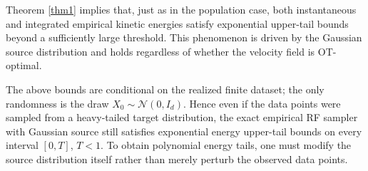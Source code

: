 \documentclass[a4paper,11pt]{article}
\theoremstyle{plain}
\theoremstyle{definition}
\begin{document}

Theorem \ref{thm1} implies that, just as in the population case, both instantaneous and integrated empirical kinetic energies satisfy exponential upper-tail bounds beyond a sufficiently large threshold. This phenomenon is driven by the Gaussian source distribution and holds regardless of whether the velocity field is OT-optimal.

The above bounds are conditional on the realized finite dataset; the only randomness is the draw \(X_0\sim\mathcal N(0,I_d)\). Hence even if the data points were sampled from a heavy-tailed target distribution, the exact empirical RF sampler with Gaussian source still satisfies exponential  energy upper-tail bounds on every interval \([0,T]\), \(T<1\). To obtain polynomial energy tails, one must modify the source distribution itself rather than merely perturb the observed data points.



\end{document}
